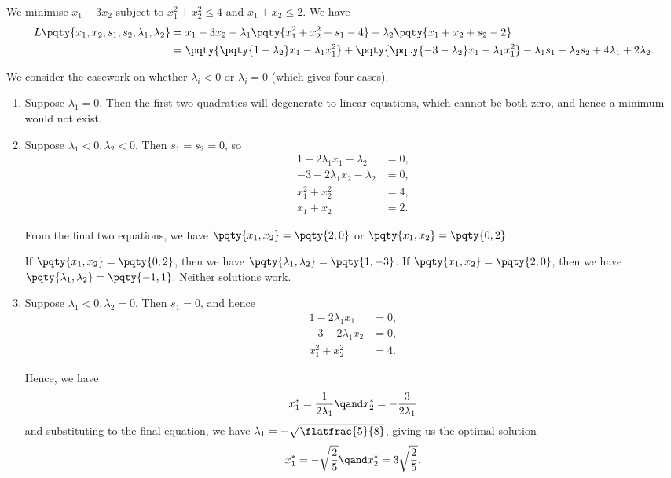 \begin{example}
    We minimise \(x_1 - 3 x_2\) subject to \(x_1^2 + x_2^2 \leq 4\) and \(x_1 + x_2 \leq 2\). We have
    \begin{align*}
        L\pqty{x_1, x_2, s_1, s_2, \lambda_1, \lambda_2} &= x_1 - 3 x_2 - \lambda_1 \pqty{x_1^2 + x_2^2 + s_1 - 4} - \lambda_2 \pqty{x_1 + x_2 + s_2 - 2} \\
        &= \pqty{\pqty{1 - \lambda_2} x_1 - \lambda_1 x_1^2} + \pqty{\pqty{-3 - \lambda_2} x_1 - \lambda_1 x_1^2} - \lambda_1 s_1 - \lambda_2 s_2 + 4 \lambda_1 + 2 \lambda_2.
    \end{align*}

    We consider the casework on whether \(\lambda_i < 0\) or \(\lambda_i = 0 \) (which gives four cases).

    \begin{enumerate}
        \item Suppose \(\lambda_1 = 0\). Then the first two quadratics will degenerate to linear equations, which cannot be both zero, and hence a minimum would not exist.
        \item Suppose \(\lambda_1 < 0, \lambda_2 < 0\). Then \(s_1 = s_2 = 0\), so
        \begin{align*}
            1 - 2 \lambda_1 x_1 - \lambda_2 &= 0, \\
            -3 - 2 \lambda_1 x_2 - \lambda_2 &= 0, \\
            x_1^2 + x_2^2 &= 4, \\
            x_1 + x_2 &= 2.
        \end{align*}

        From the final two equations, we have \(\pqty{x_1, x_2} = \pqty{2, 0}\) or \(\pqty{x_1, x_2} = \pqty{0, 2}\).
        
        If \(\pqty{x_1, x_2} = \pqty{0, 2}\), then we have \(\pqty{\lambda_1, \lambda_2} = \pqty{1, -3}\). If \(\pqty{x_1, x_2} = \pqty{2, 0}\), then we have \(\pqty{\lambda_1, \lambda_2} = \pqty{-1, 1}\). Neither solutions work.

        \item Suppose \(\lambda_1 < 0, \lambda_2 = 0\). Then \(s_1 = 0\), and hence
        \begin{align*}
            1 - 2 \lambda_1 x_1 &= 0, \\
            -3 - 2 \lambda_1 x_2 &= 0, \\
            x_1^2 + x_2^2 &= 4.
        \end{align*}

        Hence, we have
        \[
            x_1^{\ast} = \frac{1}{2 \lambda_1} \qand x_2^{\ast} = - \frac{3}{2 \lambda_1}
        \]
        and substituting to the final equation, we have \(\lambda_1 = - \sqrt{\flatfrac{5}{8}}\), giving us the optimal solution
        \[
            x_1^{\ast} = - \sqrt{\frac{2}{5}} \qand x_2^{\ast} = 3 \sqrt{\frac{2}{5}}.
        \]
    \end{enumerate}
\end{example}

